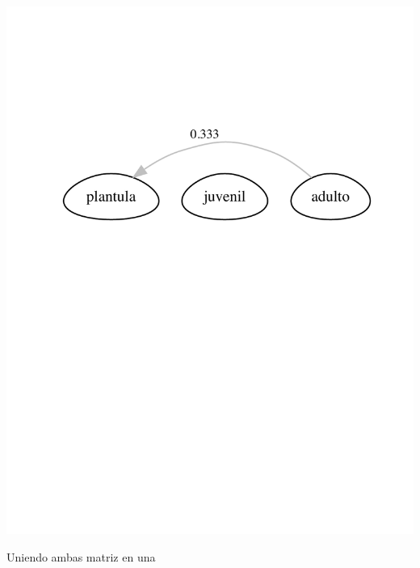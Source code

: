 \documentclass[
]{book}
\newenvironment{Shaded}{\begin{snugshade}}{\end{snugshade}}
\newcommand{\AttributeTok}[1]{\textcolor[rgb]{0.13,0.29,0.53}{#1}}
\newcommand{\FunctionTok}[1]{\textcolor[rgb]{0.13,0.29,0.53}{\textbf{#1}}}
\newcommand{\NormalTok}[1]{#1}
\newcommand{\OtherTok}[1]{\textcolor[rgb]{0.56,0.35,0.01}{#1}}
\newcommand{\SpecialCharTok}[1]{\textcolor[rgb]{0.81,0.36,0.00}{\textbf{#1}}}
\theoremstyle{definition}
\theoremstyle{definition}
\theoremstyle{definition}
\theoremstyle{definition}
\theoremstyle{remark}
\begin{document}
\begin{Shaded}
\end{Shaded}

\includegraphics{Diagnostico_Poblacional_files/figure-latex/unnamed-chunk-62-2.pdf}

Uniendo ambas matriz en una

\begin{Shaded}
\end{Shaded}
\end{document}

